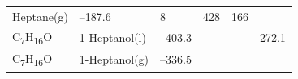 \documentclass[
  9pt,
]{extbook}
\theoremstyle{definition}
\theoremstyle{definition}
\theoremstyle{definition}
\theoremstyle{remark}
\begin{document}
\begin{longtable}[]{@{}llllll@{}}
\begin{minipage}[t]{0.17\columnwidth}
Heptane(g)\strut
\end{minipage} & \begin{minipage}[t]{0.15\columnwidth}\raggedright
--187.6\strut
\end{minipage} & \begin{minipage}[t]{0.15\columnwidth}\raggedright
8\strut
\end{minipage} & \begin{minipage}[t]{0.14\columnwidth}\raggedright
428\strut
\end{minipage} & \begin{minipage}[t]{0.14\columnwidth}\raggedright
166\strut
\end{minipage}\tabularnewline
\begin{minipage}[t]{0.07\columnwidth}\raggedright
C\textsubscript{7}H\textsubscript{16}O\strut
\end{minipage} & \begin{minipage}[t]{0.17\columnwidth}\raggedright
1-Heptanol(l)\strut
\end{minipage} & \begin{minipage}[t]{0.15\columnwidth}\raggedright
--403.3\strut
\end{minipage} & \begin{minipage}[t]{0.15\columnwidth}\raggedright
\strut
\end{minipage} & \begin{minipage}[t]{0.14\columnwidth}\raggedright
\strut
\end{minipage} & \begin{minipage}[t]{0.14\columnwidth}\raggedright
272.1\strut
\end{minipage}\tabularnewline
\begin{minipage}[t]{0.07\columnwidth}\raggedright
C\textsubscript{7}H\textsubscript{16}O\strut
\end{minipage} & \begin{minipage}[t]{0.17\columnwidth}\raggedright
1-Heptanol(g)\strut
\end{minipage} & \begin{minipage}[t]{0.15\columnwidth}\raggedright
--336.5\strut
\end{minipage} & \begin{minipage}[t]{0.15\columnwidth}\raggedright
\strut
\end{minipage} & \begin{minipage}[t]{0.14\columnwidth}\raggedright
\strut
\end{minipage} & \begin{minipage}[t]{0.14\columnwidth}\raggedright

\end{minipage}
\end{longtable}
\end{document}
